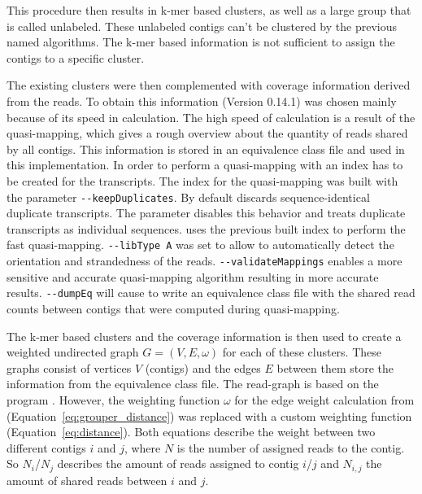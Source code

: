 \documentclass[12pt,a4paper,english]{article}
\begin{document}
	This procedure then results in k-mer based clusters, as well as a large group that is called unlabeled. These unlabeled contigs can't be clustered by the previous named algorithms. The k-mer based information is not sufficient to assign the contigs to a specific cluster. 
	
	The existing clusters were then complemented with coverage information derived from the reads. To obtain this information \salmon (Version 0.14.1) \citep{salmon:17} was chosen mainly because of its speed in calculation. 
	The high speed of calculation is a result of the quasi-mapping, which gives a rough overview about the quantity of reads shared by all contigs. This information is stored in an equivalence class file and used in this implementation.
	In order to perform a quasi-mapping with \salmon an index has to be created for the transcripts. The index for the quasi-mapping was built with the parameter \texttt{-{}-keepDuplicates}. By default \salmon discards sequence-identical duplicate transcripts. The parameter disables this behavior and treats duplicate transcripts as individual sequences.
	\salmon	uses the previous built index to perform the fast quasi-mapping. \texttt{-{}-libType A} was set to allow \salmon to automatically detect the orientation and strandedness of the reads.
	\texttt{-{}-validateMappings} enables a more sensitive and accurate quasi-mapping algorithm resulting in more accurate results. \texttt{-{}-dumpEq} will cause \salmon to write an equivalence class file with the shared read counts between contigs that were computed during quasi-mapping.

	The k-mer based clusters and the coverage information is then used to create a weighted undirected graph $ G = (V, E, \omega) $ for each of these clusters. These graphs consist of vertices $V$ (contigs) and the edges $E$ between them store the information from the \salmon equivalence class file. The read-graph is based on the program \grouper \citep{Grouper:18}. However, the weighting function $\omega$ for the edge weight calculation from \grouper (Equation~\ref{eq:grouper_distance}) was replaced with a custom weighting function (Equation~\ref{eq:distance}). Both equations describe the weight between two different contigs $ i $ and $ j $, where $ N $ is the number of assigned reads to the contig. So $N_{i}$/$N_{j}$ describes the amount of reads assigned to contig $i$/$j$ and $ N_{i,j}$ the amount of shared reads between $i$ and $j$.
	
\end{document}
